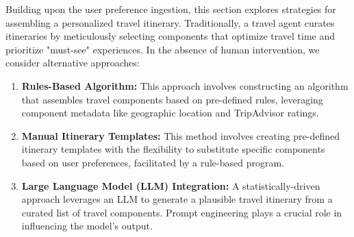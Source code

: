 \documentclass[12pt,a4paper]{report}
\begin{document}
Building upon the user preference ingestion, this section explores strategies for assembling a personalized travel itinerary.  Traditionally, a travel agent curates itineraries by meticulously selecting components that optimize travel time and prioritize "must-see" experiences.  In the absence of human intervention, we consider alternative approaches:
\begin{enumerate}
\item{\textbf{Rules-Based Algorithm:} This approach involves constructing an algorithm that assembles travel components based on pre-defined rules, leveraging component metadata like geographic location and TripAdvisor ratings.
}

\item{\textbf{Manual Itinerary Templates: }This method involves creating pre-defined itinerary templates with the flexibility to substitute specific components based on user preferences, facilitated by a rule-based program.
}

\item{\textbf{Large Language Model (LLM) Integration:} A statistically-driven approach leverages an LLM to generate a plausible travel itinerary from a curated list of travel components.  Prompt engineering plays a crucial role in influencing the model's output.
}
\end{enumerate}
\end{document}
